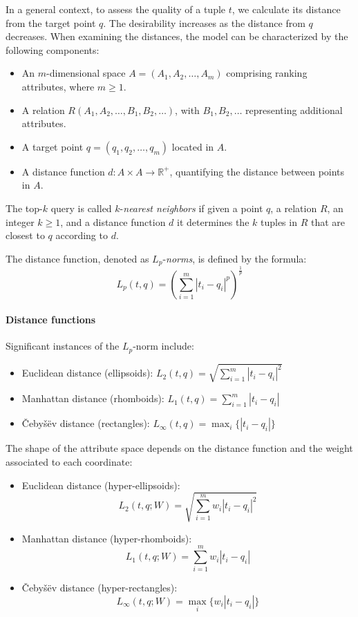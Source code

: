 In a general context, to assess the quality of a tuple $t$, we calculate its distance from the target point $q$. 
The desirability increases as the distance from $q$ decreases. 
When examining the distances, the model can be characterized by the following components:
\begin{itemize}
    \item An $m$-dimensional space $A = (A_1, A_2, \dots, A_m)$ comprising ranking attributes, where $m \geq 1$.
    \item A relation $R(A_1, A_2, \dots, B_1, B_2, \dots)$, with $B_1, B_2, \dots$ representing additional attributes.
    \item A target point $q = (q_1, q_2, \dots, q_m)$ located in $A$.
    \item A distance function $d: A \times A \rightarrow \mathbb{R}^{+}$, quantifying the distance between points in $A$.
\end{itemize}
\begin{definition}
    The top-$k$ query is called $k$-\emph{nearest neighbors} if given a point $q$, a relation $R$, an integer $k \geq 1$, and a distance function $d$ it determines the $k$ tuples in $R$ that are closest to $q$ according to $d$. 

    The distance function, denoted as $L_p$-\emph{norms}, is defined by the formula:
    \[L_p(t,q)=\left(\sum_{i=1}^{m}{\left\lvert t_i-q_i \right\rvert^{p}}\right)^{\frac{1}{p}}\]
\end{definition}

\paragraph*{Distance functions}
Significant instances of the $L_p$-norm include:
\begin{itemize}
    \item Euclidean distance (ellipsoids): $L_2(t,q)=\sqrt{\sum_{i=1}^{m}{\left\lvert t_i-q_i \right\rvert^{2}}}$
    \item Manhattan distance (rhomboids): $L_1(t,q)=\sum_{i=1}^{m}{\left\lvert t_i-q_i \right\rvert}$
    \item Čebyšëv distance (rectangles): $L_{\infty}(t,q)=\max_{i}\{\left\lvert t_i-q_i\right\rvert\}$
\end{itemize}
The shape of the attribute space depends on the distance function and the weight associated to each coordinate: 
\begin{itemize}
    \item Euclidean distance (hyper-ellipsoids):
        \[L_2(t,q;W)=\sqrt{\sum_{i=1}^{m}{w_i\left\lvert t_i-q_i \right\rvert^{2}}}\]
    \item Manhattan distance (hyper-rhomboids): 
        \[L_1(t,q;W)=\sum_{i=1}^{m}{w_i\left\lvert t_i-q_i \right\rvert}\]
    \item Čebyšëv distance (hyper-rectangles): 
        \[L_{\infty}(t,q;W)=\max_{i}\{w_i \left\lvert t_i-q_i\right\rvert\}\]
\end{itemize}

